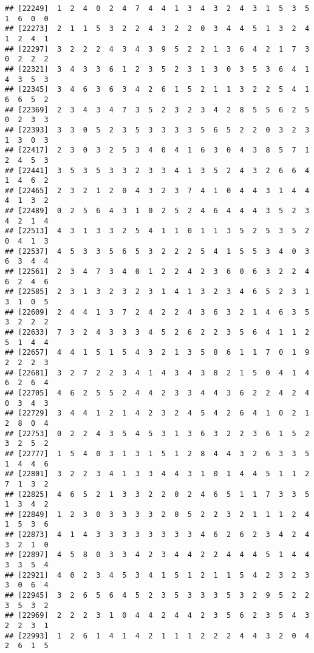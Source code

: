 \documentclass[
]{article}
\begin{document}
\begin{verbatim}
## [22249]  1  2  4  0  2  4  7  4  4  1  3  4  3  2  4  3  1  5  3  5  1  6  0  0
## [22273]  2  1  1  5  3  2  2  4  3  2  2  0  3  4  4  5  1  3  2  4  1  2  4  1
## [22297]  3  2  2  2  4  3  4  3  9  5  2  2  1  3  6  4  2  1  7  3  0  2  2  2
## [22321]  3  4  3  3  6  1  2  3  5  2  3  1  3  0  3  5  3  6  4  1  4  3  5  3
## [22345]  3  4  6  3  6  3  4  2  6  1  5  2  1  1  3  2  2  5  4  1  6  6  5  2
## [22369]  2  3  4  3  4  7  3  5  2  3  2  3  4  2  8  5  5  6  2  5  0  2  3  3
## [22393]  3  3  0  5  2  3  5  3  3  3  3  5  6  5  2  2  0  3  2  3  1  3  0  3
## [22417]  2  3  0  3  2  5  3  4  0  4  1  6  3  0  4  3  8  5  7  1  2  4  5  3
## [22441]  3  5  3  5  3  3  2  3  3  4  1  3  5  2  4  3  2  6  6  4  1  4  6  2
## [22465]  2  3  2  1  2  0  4  3  2  3  7  4  1  0  4  4  3  1  4  4  4  1  3  2
## [22489]  0  2  5  6  4  3  1  0  2  5  2  4  6  4  4  4  3  5  2  3  4  2  1  4
## [22513]  4  3  1  3  3  2  5  4  1  1  0  1  1  3  5  2  5  3  5  2  0  4  1  3
## [22537]  4  5  3  3  5  6  5  3  2  2  2  5  4  1  5  5  3  4  0  3  6  3  4  4
## [22561]  2  3  4  7  3  4  0  1  2  2  4  2  3  6  0  6  3  2  2  4  6  2  4  6
## [22585]  2  3  1  3  2  3  2  3  1  4  1  3  2  3  4  6  5  2  3  1  3  1  0  5
## [22609]  2  4  4  1  3  7  2  4  2  2  4  3  6  3  2  1  4  6  3  5  3  2  2  2
## [22633]  7  3  2  4  3  3  3  4  5  2  6  2  2  3  5  6  4  1  1  2  5  1  4  4
## [22657]  4  4  1  5  1  5  4  3  2  1  3  5  8  6  1  1  7  0  1  9  2  2  2  3
## [22681]  3  2  7  2  2  3  4  1  4  3  4  3  8  2  1  5  0  4  1  4  6  2  6  4
## [22705]  4  6  2  5  5  2  4  4  2  3  3  4  4  3  6  2  2  4  2  4  0  3  4  3
## [22729]  3  4  4  1  2  1  4  2  3  2  4  5  4  2  6  4  1  0  2  1  2  8  0  4
## [22753]  0  2  2  4  3  5  4  5  3  1  3  6  3  2  2  3  6  1  5  2  3  2  5  2
## [22777]  1  5  4  0  3  1  3  1  5  1  2  8  4  4  3  2  6  3  3  5  1  4  4  6
## [22801]  3  2  2  3  4  1  3  3  4  4  3  1  0  1  4  4  5  1  1  2  7  1  3  2
## [22825]  4  6  5  2  1  3  3  2  2  0  2  4  6  5  1  1  7  3  3  5  1  3  4  2
## [22849]  1  2  3  0  3  3  3  3  2  0  5  2  2  3  2  1  1  1  2  4  1  5  3  6
## [22873]  4  1  4  3  3  3  3  3  3  3  3  4  6  2  6  2  3  4  2  4  3  2  1  0
## [22897]  4  5  8  0  3  3  4  2  3  4  4  2  2  4  4  4  5  1  4  4  3  3  5  4
## [22921]  4  0  2  3  4  5  3  4  1  5  1  2  1  1  5  4  2  3  2  3  3  0  6  4
## [22945]  3  2  6  5  6  4  5  2  3  5  3  3  3  5  3  2  9  5  2  2  3  5  3  2
## [22969]  2  2  2  3  1  0  4  4  2  4  4  2  3  5  6  2  3  5  4  3  2  2  3  1
## [22993]  1  2  6  1  4  1  4  2  1  1  1  2  2  2  4  4  3  2  0  4  2  6  1  5

\end{verbatim}
\end{document}
